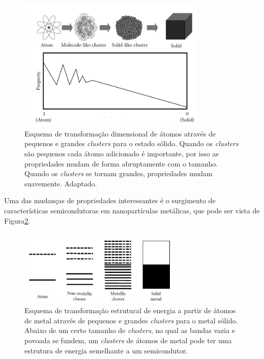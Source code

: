 \begin{figure}
  \centering
  \includegraphics[width=0.8\textwidth]{images/clusters/atomo_cluste_solido}
  \caption{Esquema de transformação dimensional de átomos através de pequenos e grandes \textit{clusters} para o estado sólido. Quando os \textit{clusters} são pequenos cada átomo adicionado é importante, por isso as propriedades mudam
de forma abruptamente com o tamanho. Quando os \textit{clusters} se tornam grandes,
propriedades mudam suavemente\cite{cap06_Nanophysics}. Adaptado.  }
  \label{fig:transicao_cluster_solido}
\end{figure}

Uma das mudanças de propriedades interessantes é o surgimento de características semicondutoras em nanopartículas metálicas, que pode ser vista de Figura\ref{fig:carac_metal}.


\begin{figure}
  \centering
  \includegraphics[width=0.7\textwidth]{images/clusters/carac_metal}
  \caption{ Esquema de transformação estrutural de energia a partir de átomos de metal através de pequenos e grandes \textit{clusters} para o metal sólido. Abaixo de um certo tamanho de \textit{clusters}, no qual as bandas vazia e povoada se fundem, um \textit{clusters} de átomos de metal pode ter uma estrutura de energia semelhante a um semicondutor.\cite{dissertacao_anderson}  }
  \label{fig:carac_metal}
\end{figure}




